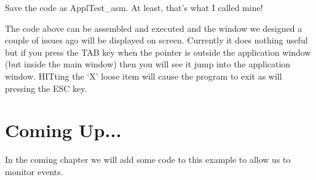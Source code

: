 Save the code as ApplTest\_asm. At least, that's
    what I called mine!

The code above can be assembled and executed and the window we
    designed a couple of issues ago will be displayed on screen. Currently it
    does nothing useful but if you press the TAB key when the pointer is
    outside the application window (but inside the main window) then you will
    see it jump into the application window. HITting the `X' loose item will
    cause the program to exit as will pressing the ESC key.

\section{Coming Up...}
\label{ch27-the-end}%

In the coming chapter we will add some code to this example to allow us to
    monitor events.

